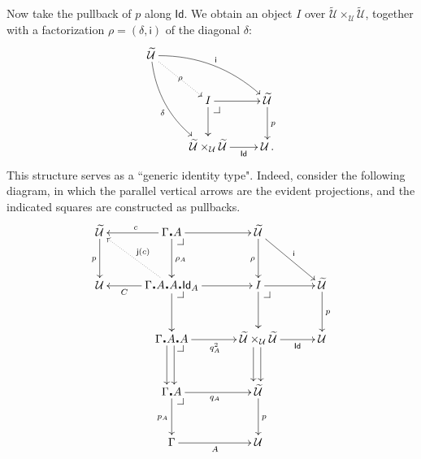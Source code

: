 \documentclass[12pt]{article}
\makeatletter
\newcommand{\pbcorner}[1][dr]{\save*!/#1-1.2pc/#1:(-1,1)@^{|-}\restore}
\newcommand{\G}{\ensuremath{\Gamma}}
\newcommand{\type}{\mathsf{type}}
\newcommand{\types}[2]{#1 \vdash #2:\type}
\newcommand{\Gtypes}[1]{\types{\Gamma}{#1}}
\newcommand{\ext}[2]{{#1\!\centerdot\! #2}}
\newcommand{\exdot}{\ensuremath{\!\centerdot\!}}
\newcommand{\Id}{\mathsf{Id}}
\newcommand{\id}[1]{\Id_{#1}}
\newcommand{\jay}{\mathsf{j}}
\newcommand{\iy}{\mathsf{i}}
\newcommand{\U}{\ensuremath{\mathcal{U}}}
\newcommand{\UU}{\ensuremath{\widetilde{\mathcal{U}}}}
\theoremstyle{definition}
\makeatother
\begin{document}
Now take the pullback of $p$ along $\Id$.  We obtain an object $I$ over $\UU\times_\U \UU$, together with a factorization $\rho = (\delta, \iy)$ of the diagonal $\delta$:
\begin{equation*}
\xymatrix{
\UU \ar@/{}_{1pc}/[ddr]_{\delta} \ar@{.>}[dr]|-{\rho} \ar@/{}^{1pc}/[drr]^{\iy} &&\\
& I \ar[r]  \ar[d]  \pbcorner & \UU \ar[d]^p \\
& \UU\times_\U \UU \ar[r]_-{\Id} & \U\,.
}
\end{equation*}
%
This structure serves as a ``generic identity type".
%
%
Indeed, consider the following diagram, in which the parallel vertical arrows are the evident projections, and the indicated squares are constructed as pullbacks.
\begin{equation}\label{diag:big}
\xymatrix@=3em{
\UU \ar[d]_{p} & \G\exdot A \ar[l]_c \ar[d]^{\rho_A} \ar[r] \pbcorner 					& \UU \ar[d]_{\rho} \ar[dr]^{\iy} 					& \\
\U & \G\exdot A\exdot A\exdot\Id_A \ar[l]^-C \ar@{.>}[lu]_{\jay(c)} \ar[d] \ar[r] \pbcorner 	& I \ar[d] \ar[r] \pbcorner 					& \UU \ar[d]^{p} \\
& {\G\exdot A\exdot A} \ar@<-1ex>[d] \ar@<.5ex>[d] \ar[r]_{q^2_A}  \pbcorner 	& \UU\times_\U \UU \ar[r]_-{\Id} \ar@<-1ex>[d] \ar@<.5ex>[d] 	& \U \\
& \ext{\G}{A} \ar[d]_{p_A} \ar[r]_{q_A} \pbcorner 			& \UU \ar[d]^{p} 						& \\
& \G \ar[r]_A 									& \U 									&
}
\end{equation}
\end{document}
